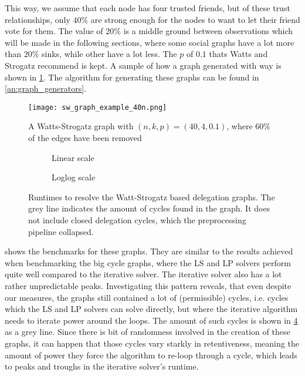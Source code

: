 This way, we assume that each node has four trusted friends, but of these trust relationships, only $40\%$ are strong enough for the nodes to want to let their friend vote for them. The value of $20\%$ is a middle ground between observations which will be made in the following sections, where some social graphs have a lot more than $20\%$ sinks, while other have a lot less. The $p$ of $0.1$ thats Watts and Strogatz recommend is kept. A sample of how a graph generated with way is shown in \cref{fig:ws_example}. The algorithm for generating these graphs can be found in \cref{an:graph_generators}.

\begin{figure}
\centering
\texttt{[image: sw\_graph\_example\_40n.png]}
\caption{A Watts-Strogatz graph with $(n, k, p) = (40, 4, 0.1)$, where $60\%$ of the edges have been removed}
\label{fig:ws_example}
\end{figure}

\begin{figure}[t]
    \centering
    \begin{subfigure}[t]{0.45\textwidth}
        \centering
        \caption{Linear scale}
        \label{subfig:sw_linear}
    \end{subfigure}
    \hfill
    \begin{subfigure}[t]{0.45\textwidth}
        \centering
        \caption{Loglog scale}
        \label{subfig:sw_loglog}
    \end{subfigure}
    \caption{Runtimes to resolve the Watt-Strogatz based delegation graphs. The grey line indicates the amount of cycles found in the graph. It does not include closed delegation cycles, which the preprocessing pipeline collapsed.}
    \label{fig:sw}
\end{figure}




 shows the benchmarks for these graphs. They are similar to the results achieved when benchmarking the big cycle graphs, where the LS and LP solvers perform quite well compared to the iterative solver. The iterative solver also has a lot rather unpredictable peaks. Investigating this pattern reveals, that even despite our measures, the graphs still contained a lot of (permissible) cycles, i.e. cycles which the LS and LP solvers can solve directly, but where the iterative algorithm needs to iterate power around the loops. The amount of such cycles is shown in \cref{fig:sw} as a grey line. Since there is bit of randomness involved in the creation of these graphs, it can happen that those cycles vary starkly in retentiveness, meaning the amount of power they force the algorithm to re-loop through a cycle, which leads to peaks and troughs in the iterative solver's runtime. 
 
